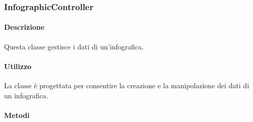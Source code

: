 \newpage
\subsubsection{InfographicController}

	\paragraph{Descrizione}
		Questa classe gestisce i dati di un'infografica.
	\paragraph{Utilizzo}
		La classe è progettata per consentire la creazione e la manipolazione dei dati di un infografica.
		
	\paragraph{Metodi}
